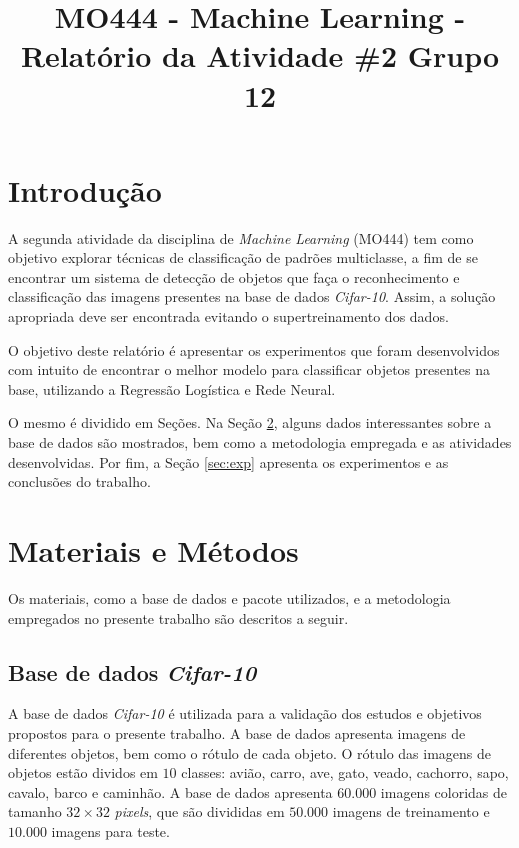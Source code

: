 \documentclass[conference]{IEEEtran}
\begin{document}
\title{MO444 - Machine Learning - Relatório da Atividade \#2 Grupo 12}

\author{
\and
{}
}

\maketitle

\section{Introdução}

A segunda atividade da disciplina de \textit{Machine Learning} (MO444) tem como objetivo explorar técnicas de classificação de padrões multiclasse, a fim de se encontrar um sistema de detecção de objetos que faça o reconhecimento e classificação das imagens presentes na base de dados \textit{Cifar-10}. Assim, a solução apropriada deve ser encontrada evitando o supertreinamento dos dados. 

O objetivo deste relatório é apresentar os experimentos que foram desenvolvidos com intuito de encontrar o melhor modelo para classificar objetos presentes na base, utilizando a Regressão Logística e Rede Neural.

O mesmo é dividido em Seções. Na Seção \ref{sec:meto}, alguns dados interessantes sobre a base de dados são mostrados, bem como a metodologia empregada e as atividades desenvolvidas. Por fim,  a Seção \ref{sec:exp} apresenta os experimentos e as conclusões do trabalho.

\section{Materiais e Métodos} \label{sec:meto}

Os materiais, como a base de dados e pacote utilizados, e a metodologia empregados no presente trabalho são descritos a seguir.

\subsection{Base de dados \textit{Cifar-10}} \label{sec:base}

A base de dados \emph{Cifar-10} é utilizada para a validação dos estudos e objetivos propostos para o presente trabalho. A base de dados apresenta imagens de diferentes objetos, bem como o rótulo de cada objeto. O rótulo das imagens de objetos estão dividos em $10$ classes: avião, carro, ave, gato, veado, cachorro, sapo, cavalo, barco e caminhão. A base de dados apresenta $60.000$ imagens coloridas de tamanho $32 \times 32$ \textit{pixels}, que são  divididas em $50.000$ imagens de treinamento e $10.000$ imagens para teste.
\end{document}
